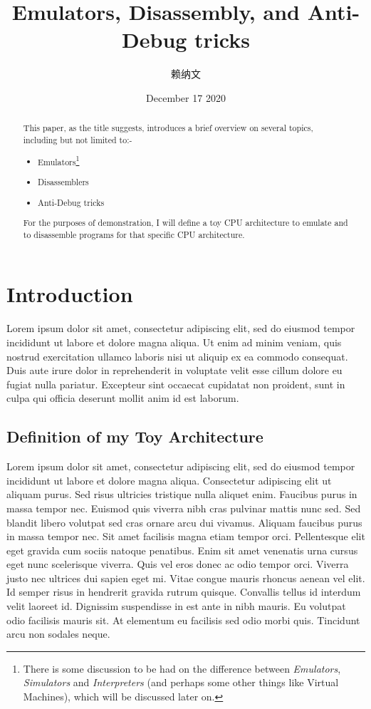 \documentclass[twocolumn, a4paper,12pt]{article}
\title{Emulators, Disassembly, and Anti-Debug tricks}
\author{\cjkfont 赖纳文}
\date{December 17 2020}
\begin{document}
\maketitle

\begin{abstract}
This paper, as the title suggests, introduces a brief overview on several topics, including but not limited to:-
\begin{itemize}
 \item Emulators\footnote{There is some discussion to be had on the difference between \textit{Emulators},
 \textit{Simulators} and \textit{Interpreters} (and perhaps some other things like Virtual Machines), 
 which will be discussed later on.}
 \item Disassemblers
 \item Anti-Debug tricks
\end{itemize}
For the purposes of demonstration, I will define a toy CPU architecture to emulate and to
disassemble programs for that specific CPU architecture.
\end{abstract}

\section{Introduction}
Lorem ipsum dolor sit amet, consectetur adipiscing elit, sed do eiusmod tempor incididunt ut labore et dolore magna aliqua. Ut enim ad minim veniam, quis nostrud exercitation ullamco laboris nisi ut aliquip ex ea commodo consequat. Duis aute irure dolor in reprehenderit in voluptate velit esse cillum dolore eu fugiat nulla pariatur. Excepteur sint occaecat cupidatat non proident, sunt in culpa qui officia deserunt mollit anim id est laborum.

\subsection{Definition of my Toy Architecture}
Lorem ipsum dolor sit amet, consectetur adipiscing elit, sed do eiusmod tempor incididunt ut labore et dolore magna aliqua. Consectetur adipiscing elit ut aliquam purus. Sed risus ultricies tristique nulla aliquet enim. Faucibus purus in massa tempor nec. Euismod quis viverra nibh cras pulvinar mattis nunc sed. Sed blandit libero volutpat sed cras ornare arcu dui vivamus. Aliquam faucibus purus in massa tempor nec. Sit amet facilisis magna etiam tempor orci. Pellentesque elit eget gravida cum sociis natoque penatibus. Enim sit amet venenatis urna cursus eget nunc scelerisque viverra. Quis vel eros donec ac odio tempor orci. Viverra justo nec ultrices dui sapien eget mi. Vitae congue mauris rhoncus aenean vel elit. Id semper risus in hendrerit gravida rutrum quisque. Convallis tellus id interdum velit laoreet id. Dignissim suspendisse in est ante in nibh mauris. Eu volutpat odio facilisis mauris sit. At elementum eu facilisis sed odio morbi quis. Tincidunt arcu non sodales neque.
\end{document}
